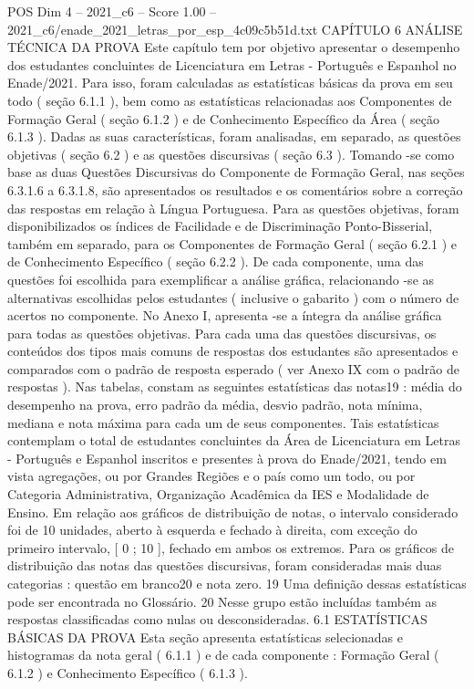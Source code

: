 \begin{textsample}{POS Dim 4 – 2021\_c6 – Score 1.00 – 2021\_c6/enade\_2021\_letras\_por\_esp\_4c09c5b51d.txt}  \label{ex:f4_pos_068}
CAPÍTULO 6 ANÁLISE TÉCNICA DA PROVA Este capítulo tem por objetivo apresentar o desempenho dos estudantes concluintes de Licenciatura em Letras - Português e Espanhol no Enade/2021.
Para isso, foram calculadas as estatísticas básicas da prova em seu todo ( seção 6.1.1 ), bem como as estatísticas relacionadas aos Componentes de Formação Geral ( seção 6.1.2 ) e de Conhecimento Específico da Área ( seção 6.1.3 ).
Dadas as suas características, foram analisadas, em separado, as questões objetivas ( seção 6.2 ) e as questões discursivas ( seção 6.3 ).
Tomando -se como base as duas Questões Discursivas do Componente de Formação Geral, nas seções 6.3.1.6 a 6.3.1.8, são apresentados os resultados e os comentários sobre a correção das respostas em relação à Língua Portuguesa.
Para as questões objetivas, foram disponibilizados os índices de Facilidade e de Discriminação Ponto-Bisserial, também em separado, para os Componentes de Formação Geral ( seção 6.2.1 ) e de Conhecimento Específico ( seção 6.2.2 ).
De cada componente, uma das questões foi escolhida para exemplificar a análise gráfica, relacionando -se as alternativas escolhidas pelos estudantes ( inclusive o gabarito ) com o número de acertos no componente.
No Anexo I, apresenta -se a íntegra da análise gráfica para todas as questões objetivas.
Para cada uma das questões discursivas, os conteúdos dos tipos mais comuns de respostas dos estudantes são apresentados e comparados com o padrão de resposta esperado ( ver Anexo IX com o padrão de respostas ).
Nas tabelas, constam as seguintes estatísticas das notas19 : média do desempenho na prova, erro padrão da média, desvio padrão, nota mínima, mediana e nota máxima para cada um de seus componentes.
Tais estatísticas contemplam o total de estudantes concluintes da Área de Licenciatura em Letras - Português e Espanhol inscritos e presentes à prova do Enade/2021, tendo em vista agregações, ou por Grandes Regiões e o país como um todo, ou por Categoria Administrativa, Organização Acadêmica da IES e Modalidade de Ensino.
Em relação aos gráficos de distribuição de notas, o intervalo considerado foi de 10 unidades, aberto à esquerda e fechado à direita, com exceção do primeiro intervalo, [ 0 ; 10 ], fechado em ambos os extremos.
Para os gráficos de distribuição das notas das questões discursivas, foram consideradas mais duas categorias : questão em branco20 e nota zero. 19 Uma definição dessas estatísticas pode ser encontrada no Glossário. 20 Nesse grupo estão incluídas também as respostas classificadas como nulas ou desconsideradas. 6.1 ESTATÍSTICAS BÁSICAS DA PROVA Esta seção apresenta estatísticas selecionadas e histogramas da nota geral ( 6.1.1 ) e de cada componente : Formação Geral ( 6.1.2 ) e Conhecimento Específico ( 6.1.3 ).

\end{textsample}
